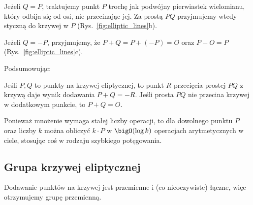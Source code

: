 Jeżeli \( Q = P \), traktujemy punkt \( P \) trochę jak podwójny pierwiastek wielomianu, który odbija się od osi, nie przecinając jej.
Za prostą \( PQ \) przyjmujemy wtedy styczną do krzywej w \( P \) (Rys.~\ref{fig:elliptic_lines}b).

Jeżeli \( Q = -P \), przyjmujemy, że \( P + Q = P + (-P) = O \) oraz \(P + O = P \) (Rys.~\ref{fig:elliptic_lines}c).

Podsumowując:
\begin{definition}[Dodawanie]
    Jeśli \( P, Q \) to punkty na krzywej eliptycznej, to punkt \( R \) przecięcia prostej \( PQ \) z krzywą daje wynik dodawania \( P + Q = -R \).
    Jeśli prosta \( PQ \) nie przecina krzywej w dodatkowym punkcie, to \( P + Q = O \).
\end{definition}


Ponieważ mnożenie wymaga stałej liczby operacji, to dla dowolnego punktu \( P \) oraz liczby \( k \) można obliczyć \( k \cdot P \) w \( \bigO(\log k) \) operacjach arytmetycznych w ciele, stosując coś w rodzaju szybkiego potęgowania.


\subsection{Grupa krzywej eliptycznej}
Dodawanie punktów na krzywej jest przemienne i (co nieoczywiste) łączne, więc otrzymujemy grupę przemienną.

